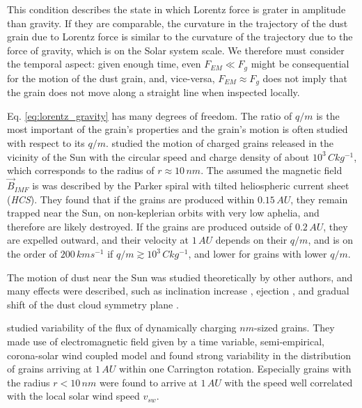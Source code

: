 This condition describes the state in which Lorentz force is grater in amplitude than gravity. If they are comparable, the curvature in the trajectory of the dust grain due to Lorentz force is similar to the curvature of the trajectory due to the force of gravity, which is on the Solar system scale. We therefore must consider the temporal aspect: given enough time, even $F_{EM} \ll F_g$ might be consequential for the motion of the dust grain, and, vice-versa, $F_{EM} \approx F_g$ does not imply that the grain does not move along a straight line when inspected locally. 

Eq. \ref{eq:lorentz_gravity} has many degrees of freedom. The ratio of $q/m$ is the most important of the grain's properties and the grain's motion is often studied with respect to its $q/m$. \citeauthor{czechowski2010formation} \citep{czechowski2010formation} studied the motion of charged grains released in the vicinity of the Sun with the circular speed and charge density of about $10^3 \, \si{C kg^{-1}}$, which corresponds to the radius of $r \approx 10 \, \si{nm}$. The assumed the magnetic field $\vec{B}_{IMF}$ is was described by the Parker spiral \citep{parker1958dynamics} with tilted heliospheric current sheet (\textit{HCS}). They found that if the grains are produced within $0.15 \, \si{AU}$, they remain trapped near the Sun, on non-keplerian orbits with very low aphelia, and therefore are likely destroyed. If the grains are produced outside of $0.2 \, \si{AU}$, they are expelled outward, and their velocity at $1 \, \si{AU}$ depends on their $q/m$, and is on the order of $200 \, \si{km s^{-1}}$ if $q/m \gtrsim 10^3 \, \si{C kg^{-1}}$, and lower for grains with lower $q/m$. 

The motion of dust near the Sun was studied theoretically by other authors, and many effects were described, such as inclination increase \citep{krivov1998dynamics}, ejection \citep{krivov1998dynamics}, and gradual shift of the dust cloud symmetry plane \citep{morfill1979motion}.

\citeauthor{poppe2020effects} \cite{poppe2020effects} studied variability of the flux of dynamically charging $\si{nm}$-sized grains. They made use of electromagnetic field given by a time variable, semi-empirical, corona-solar wind coupled model and found strong variability in the distribution of grains arriving at $1 \, \si{AU}$ within one Carrington rotation. Especially grains with the radius $r<10 \, \si{nm}$ were found to arrive at $1 \, \si{AU}$ with the speed well correlated with the local solar wind speed $v_{sw}$. 

